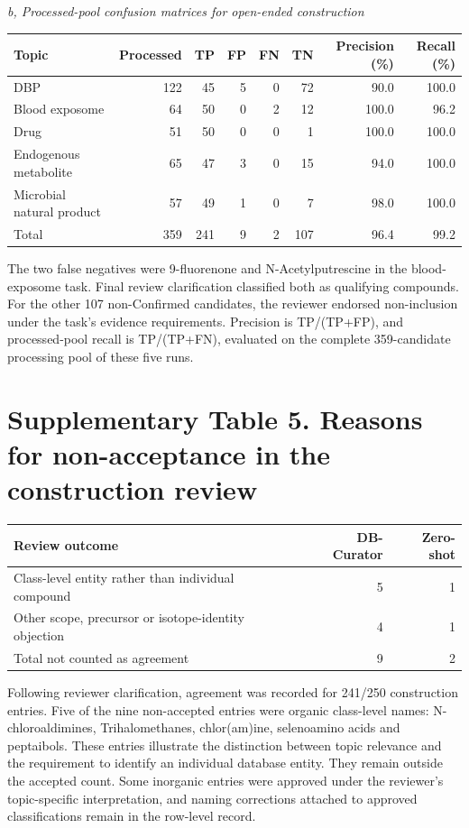 \documentclass[10pt]{article}
\begin{document}
\textit{b, Processed-pool confusion matrices for open-ended construction}
\begin{center}\small
\begin{tabular}{lrrrrrrr}
\toprule
Topic & Processed & TP & FP & FN & TN & Precision (\%) & Recall (\%)\\
\midrule
DBP & 122 & 45 & 5 & 0 & 72 & 90.0 & 100.0\\
Blood exposome & 64 & 50 & 0 & 2 & 12 & 100.0 & 96.2\\
Drug & 51 & 50 & 0 & 0 & 1 & 100.0 & 100.0\\
Endogenous metabolite & 65 & 47 & 3 & 0 & 15 & 94.0 & 100.0\\
Microbial natural product & 57 & 49 & 1 & 0 & 7 & 98.0 & 100.0\\
\midrule
Total & 359 & 241 & 9 & 2 & 107 & 96.4 & 99.2\\
\bottomrule
\end{tabular}
\end{center}
The two false negatives were 9-fluorenone and N-Acetylputrescine in the blood-exposome task. Final review clarification classified both as qualifying compounds. For the other 107 non-Confirmed candidates, the reviewer endorsed non-inclusion under the task's evidence requirements. Precision is TP/(TP+FP), and processed-pool recall is TP/(TP+FN), evaluated on the complete 359-candidate processing pool of these five runs.

\section*{Supplementary Table 5. Reasons for non-acceptance in the construction review}
\begin{center}\small
\begin{tabular}{lrr}
\toprule
Review outcome & DB-Curator & Zero-shot\\
\midrule
Class-level entity rather than individual compound & 5 & 1\\
Other scope, precursor or isotope-identity objection & 4 & 1\\
Total not counted as agreement & 9 & 2\\
\bottomrule
\end{tabular}
\end{center}

Following reviewer clarification, agreement was recorded for 241/250 construction entries. Five of the nine non-accepted entries were organic class-level names: N-chloroaldimines, Trihalomethanes, chlor(am)ine, selenoamino acids and peptaibols. These entries illustrate the distinction between topic relevance and the requirement to identify an individual database entity. They remain outside the accepted count. Some inorganic entries were approved under the reviewer's topic-specific interpretation, and naming corrections attached to approved classifications remain in the row-level record.
\end{document}
